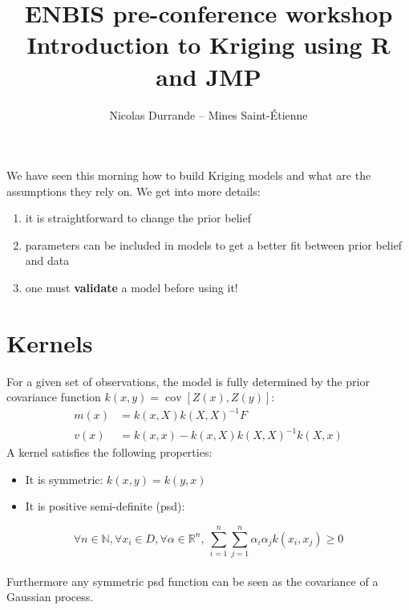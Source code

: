 \documentclass{beamer}
\title[ENBIS workshop: Introduction to Kriging 2/2]{ \small ENBIS pre-conference workshop\\ \vspace{3mm} \Large Introduction to Kriging using R and JMP }
\author[11th of Septembre 2016]{Nicolas Durrande -- Mines Saint-Étienne}
\institute{durrande@emse.fr}
\date{\null}
\DeclareMathOperator*{\Cov}{cov}
\begin{document}

\begin{frame}
  \titlepage
\end{frame}

\begin{frame}{}
We have seen this morning how to build Kriging models and what are the assumptions they rely on. We get into more details:
\begin{enumerate}
  \item it is straightforward to change the prior belief
  \item parameters can be included in models to get a better fit between prior belief and data
  \item one must \textbf{validate} a model before using it!
\end{enumerate}
\end{frame}

\section{Kernels}

\begin{frame}{}
For a given set of observations, the model is fully determined by the prior covariance function $k(x,y) = \Cov[Z(x),Z(y)]$:
\begin{equation*}
  \begin{split}
    m(x) &= k(x,X) k(X,X)^{-1} F \\
    v(x) &= k(x,x) - k(x,X) k(X,X)^{-1} k(X,x)
  \end{split}
\end{equation*}
A kernel satisfies the following properties:
\begin{itemize}
  \item It is symmetric: $k(x,y) = k(y,x)$
  \item It is positive semi-definite (psd):
\end{itemize}
\begin{equation*}
  \forall n \in \mathds{N}, \forall x_i \in D, \forall \alpha \in \mathds{R}^n,\  \sum_{i=1}^n \sum_{j=1}^n \alpha_i \alpha_j k(x_i,x_j) \geq 0
\end{equation*}
\vspace{5mm} \\
Furthermore any symmetric psd function can be seen as the covariance of a Gaussian process.
\end{frame}
\end{document}
